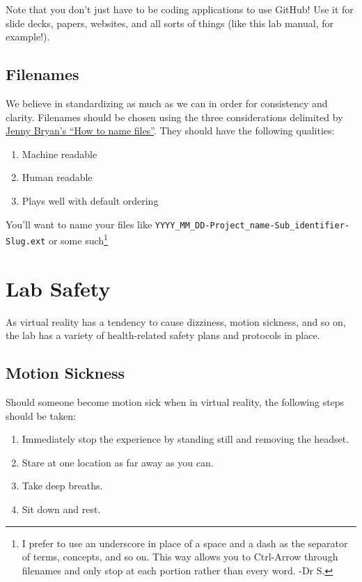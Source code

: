 \documentclass[]{tufte-book}
\providecommand{\tightlist}{%
  \setlength{\itemsep}{0pt}\setlength{\parskip}{0pt}}
\begin{document}
Note that you don't just have to be coding applications to use GitHub! Use it for slide decks, papers, websites, and all sorts of things (like this lab manual, for example!).

\hypertarget{filenames}{%
\subsection{Filenames}\label{filenames}}

We believe in standardizing as much as we can in order for consistency and clarity. Filenames should be chosen using the three considerations delimited by \href{https://speakerdeck.com/jennybc/how-to-name-files?slide=4}{Jenny Bryan's ``How to name files''}. They should have the following qualities:

\begin{enumerate}
\def\labelenumi{\arabic{enumi}.}
\tightlist
\item
  Machine readable
\item
  Human readable
\item
  Plays well with default ordering
\end{enumerate}

You'll want to name your files like \texttt{YYYY\_MM\_DD-Project\_name-Sub\_identifier-Slug.ext} or some such\footnote{I prefer to use an underscore in place of a space and a dash as the separator of terms, concepts, and so on. This way allows you to Ctrl-Arrow through filenames and only stop at each portion rather than every word. -Dr S.}

\hypertarget{lab-safety}{%
\section{Lab Safety}\label{lab-safety}}

As virtual reality has a tendency to cause dizziness, motion sickness, and so on, the lab has a variety of health-related safety plans and protocols in place.

\hypertarget{motion-sickness}{%
\subsection{Motion Sickness}\label{motion-sickness}}

Should someone become motion sick when in virtual reality, the following steps should be taken:

\begin{enumerate}
\def\labelenumi{\arabic{enumi}.}
\tightlist
\item
  Immediately stop the experience by standing still and removing the headset.
\item
  Stare at one location as far away as you can.
\item
  Take deep breaths.
\item
  Sit down and rest.
\end{enumerate}
\end{document}
